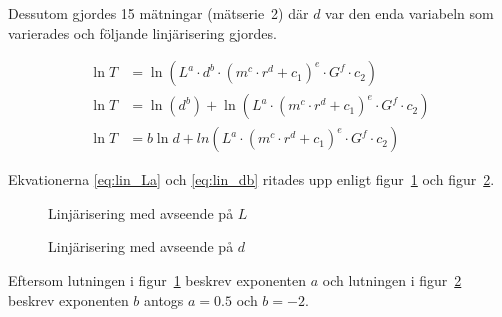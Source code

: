 \documentclass[a4paper,12pt]{article}
\begin{document}
Dessutom gjordes 15 mätningar (mätserie~2) där $d$ var den enda variabeln som varierades och
följande linjärisering gjordes.

\begin{align}
  \ln T &= \ln (L^a \cdot d^b \cdot (m^c \cdot r^d + c_1)^e \cdot G^f \cdot c_2) \nonumber \\
  \ln T &= \ln (d^b) + \ln (L^a \cdot (m^c \cdot r^d + c_1)^e \cdot G^f \cdot c_2) \nonumber \\
  \ln T &= b\ln d + ln (L^a \cdot (m^c \cdot r^d + c_1)^e \cdot G^f \cdot c_2)  \label{eq:lin_db}
\end{align}

Ekvationerna \eqref{eq:lin_La} och \eqref{eq:lin_db} ritades upp enligt
figur~\ref{fig:lin_La} och figur~\ref{fig:lin_db}.

\begin{figure}
  \caption{Linjärisering med avseende på $L$}
  \label{fig:lin_La}
\end{figure}

\begin{figure}
  \caption{Linjärisering med avseende på $d$}
  \label{fig:lin_db}
\end{figure}

Eftersom lutningen i figur~\ref{fig:lin_La} beskrev exponenten $a$ och lutningen
i figur~\ref{fig:lin_db} beskrev exponenten $b$ antogs $a = 0.5$ och $b = -2$.
\end{document}
